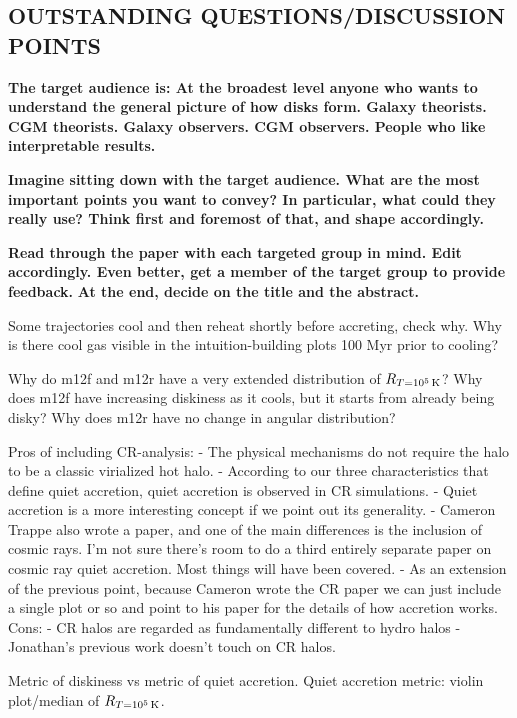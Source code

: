 \documentclass[fleqn,usenatbib]{mnras}
\newcommand{\Rcon}{R_{T=10^5\,{\rm K}}}
\begin{document}
\subsection{OUTSTANDING QUESTIONS/DISCUSSION POINTS}

\textbf{
The target audience is:
At the broadest level anyone who wants to understand the general picture of how disks form.
Galaxy theorists.
CGM theorists.
Galaxy observers.
CGM observers.
People who like interpretable results.
}

\textbf{
Imagine sitting down with the target audience.
What are the most important points you want to convey?
In particular, what could they really use?
Think first and foremost of that, and shape accordingly.
}

\textbf{
Read through the paper with each targeted group in mind.
Edit accordingly.
Even better, get a member of the target group to provide feedback.
}
\textbf{
At the end, decide on the title and the abstract.
}

Some trajectories cool and then reheat shortly before accreting, check why.
Why is there cool gas visible in the intuition-building plots 100 Myr prior to cooling?

Why do m12f and m12r have a very extended distribution of $\Rcon$?
Why does m12f have increasing diskiness as it cools, but it starts from already being disky?
Why does m12r have no change in angular distribution?

Pros of including CR-analysis:
- The physical mechanisms do not require the halo to be a classic virialized hot halo.
- According to our three characteristics that define quiet accretion, quiet accretion is observed in CR simulations.
- Quiet accretion is a more interesting concept if we point out its generality.
- Cameron Trappe also wrote a paper, and one of the main differences is the inclusion of cosmic rays. I'm not sure there's room to do a third entirely separate paper on cosmic ray quiet accretion. Most things will have been covered.
- As an extension of the previous point, because Cameron wrote the CR paper we can just include a single plot or so and point to his paper for the details of how accretion works.
Cons:
- CR halos are regarded as fundamentally different to hydro halos
- Jonathan's previous work doesn't touch on CR halos.

Metric of diskiness vs metric of quiet accretion.
Quiet accretion metric: violin plot/median of $\Rcon$.
\end{document}
